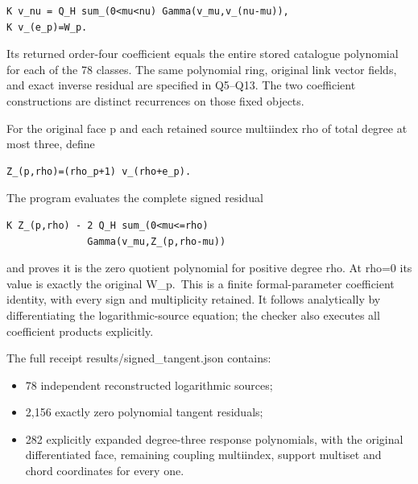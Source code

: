 \documentclass[11pt,a4paper]{article}
\providecommand{\tightlist}{\setlength{\itemsep}{0pt}\setlength{\parskip}{0pt}}
\renewcommand{\[}{\begingroup\small\originaldisplaystart}
\renewcommand{\]}{\originaldisplayend\endgroup}
\begin{document}
\begin{verbatim}
K v_nu = Q_H sum_(0<mu<nu) Gamma(v_mu,v_(nu-mu)),
K v_(e_p)=W_p.
\end{verbatim}

Its returned order-four coefficient equals the entire stored catalogue
polynomial for each of the 78 classes. The same polynomial ring,
original link vector fields, and exact inverse residual are specified in
Q5--Q13. The two coefficient constructions are distinct recurrences on
those fixed objects.

For the original face p and each retained source multiindex rho of total
degree at most three, define

\begin{verbatim}
Z_(p,rho)=(rho_p+1) v_(rho+e_p).
\end{verbatim}

The program evaluates the complete signed residual

\begin{verbatim}
K Z_(p,rho) - 2 Q_H sum_(0<mu<=rho)
              Gamma(v_mu,Z_(p,rho-mu))
\end{verbatim}

and proves it is the zero quotient polynomial for positive degree rho.
At rho=0 its value is exactly the original W\_p.~This is a finite
formal-parameter coefficient identity, with every sign and multiplicity
retained. It follows analytically by differentiating the
logarithmic-source equation; the checker also executes all coefficient
products explicitly.

The full receipt
{\ttfamily r\allowbreak{}e\allowbreak{}s\allowbreak{}u\allowbreak{}l\allowbreak{}t\allowbreak{}s\allowbreak{}/\allowbreak{}s\allowbreak{}i\allowbreak{}g\allowbreak{}n\allowbreak{}e\allowbreak{}d\allowbreak{}\_\allowbreak{}t\allowbreak{}a\allowbreak{}n\allowbreak{}g\allowbreak{}e\allowbreak{}n\allowbreak{}t\allowbreak{}.\allowbreak{}j\allowbreak{}s\allowbreak{}o\allowbreak{}n\allowbreak{}}
contains:

\begin{itemize}
\tightlist
\item
  78 independent reconstructed logarithmic sources;
\item
  2,156 exactly zero polynomial tangent residuals;
\item
  282 explicitly expanded degree-three response polynomials, with the
  original differentiated face, remaining coupling multiindex, support
  multiset and chord coordinates for every one.
\end{itemize}
\end{document}
